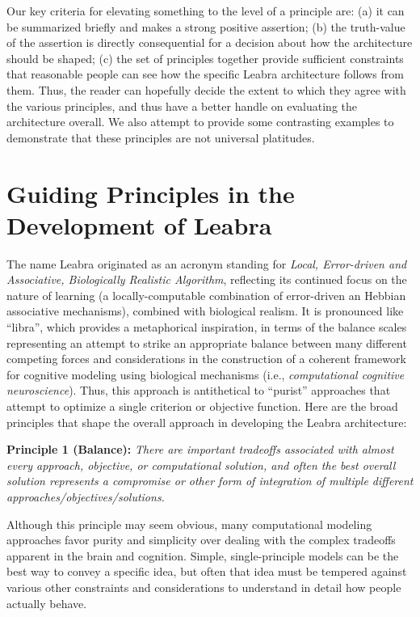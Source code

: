 \documentclass[11pt,twoside]{article}
\begin{document}
Our key criteria for elevating something to the level of a principle
are: (a) it can be summarized briefly and makes a strong positive
assertion; (b) the truth-value of the assertion is directly
consequential for a decision about how the architecture should be
shaped; (c) the set of principles together provide sufficient
constraints that reasonable people can see how the specific Leabra
architecture follows from them.  Thus, the reader can hopefully decide
the extent to which they agree with the various principles, and thus
have a better handle on evaluating the architecture overall.  We also
attempt to provide some contrasting examples to demonstrate that these
principles are not universal platitudes.

\section{Guiding Principles in the Development of Leabra}

The name Leabra originated as an acronym standing for {\em Local,
  Error-driven and Associative, Biologically Realistic Algorithm},
reflecting its continued focus on the nature of learning (a
locally-computable combination of error-driven an Hebbian associative
mechanisms), combined with biological realism.  It is pronounced like
``libra'', which provides a metaphorical inspiration, in terms of the
balance scales representing an attempt to strike an appropriate
balance between many different competing forces and considerations in
the construction of a coherent framework for cognitive modeling using
biological mechanisms (i.e., {\em computational cognitive
  neuroscience}).  Thus, this approach is antithetical to ``purist''
approaches that attempt to optimize a single criterion or objective
function.  Here are the broad principles that shape the overall
approach in developing the Leabra architecture:

{\bf Principle 1 (Balance):} {\em There are important tradeoffs
  associated with almost every approach, objective, or computational
  solution, and often the best overall solution represents a
  compromise or other form of integration of multiple different
  approaches/objectives/solutions.}

Although this principle may seem obvious, many computational modeling
approaches favor purity and simplicity over dealing with the complex
tradeoffs apparent in the brain and cognition.  Simple,
single-principle models can be the best way to convey a specific idea,
but often that idea must be tempered against various other constraints
and considerations to understand in detail how people actually behave.
\end{document}
